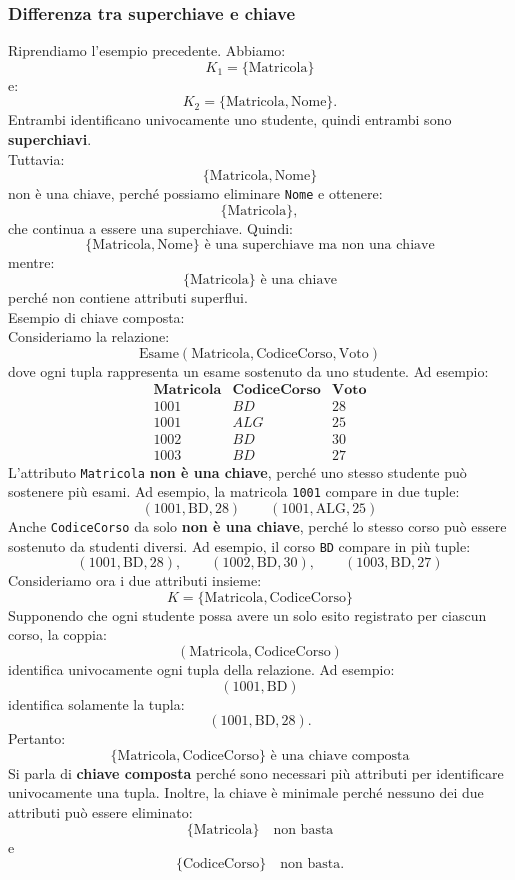 \subsubsection{Differenza tra superchiave e chiave}
Riprendiamo l'esempio precedente.
Abbiamo:
\[
K_1 = \{\text{Matricola}\}
\]
e:
\[
K_2 = \{\text{Matricola},\text{Nome}\}.
\]
Entrambi identificano univocamente uno studente, quindi entrambi sono
\textbf{superchiavi}.\\
Tuttavia:
\[
\{\text{Matricola},\text{Nome}\}
\]
non è una chiave, perché possiamo eliminare \texttt{Nome} e ottenere:
\[
\{\text{Matricola}\},
\]
che continua a essere una superchiave.
Quindi:
\[
\boxed{
\{\text{Matricola},\text{Nome}\}
\text{ è una superchiave ma non una chiave}
}
\]
mentre:
\[
\boxed{
\{\text{Matricola}\}
\text{ è una chiave}
}
\]
perché non contiene attributi superflui.\medskip\\
\textcolor{verdeEsempio}{Esempio} di chiave composta:\\
Consideriamo la relazione:
\[
\text{Esame}(\text{Matricola}, \text{CodiceCorso}, \text{Voto})
\]
dove ogni tupla rappresenta un esame sostenuto da uno studente.
Ad esempio:
\[
\begin{array}{c|c|c}
\textbf{Matricola} & \textbf{CodiceCorso} & \textbf{Voto} \\ \hline
1001 & BD & 28 \\
1001 & ALG & 25 \\
1002 & BD & 30 \\
1003 & BD & 27
\end{array}
\]
L'attributo \texttt{Matricola} \textbf{non è una chiave}, perché uno
stesso studente può sostenere più esami.
Ad esempio, la matricola \texttt{1001} compare in due tuple:
\[
(1001,\text{BD},28)
\qquad
(1001,\text{ALG},25)
\]
Anche \texttt{CodiceCorso} da solo \textbf{non è una chiave}, perché
lo stesso corso può essere sostenuto da studenti diversi.
Ad esempio, il corso \texttt{BD} compare in più tuple:
\[
(1001,\text{BD},28), \qquad
(1002,\text{BD},30), \qquad
(1003,\text{BD},27)
\]
Consideriamo ora i due attributi insieme:
\[
K = \{\text{Matricola},\text{CodiceCorso}\}
\]
Supponendo che ogni studente possa avere un solo esito registrato per
ciascun corso, la coppia:
\[
(\text{Matricola},\text{CodiceCorso})
\]
identifica univocamente ogni tupla della relazione.
Ad esempio:
\[
(1001,\text{BD})
\]
identifica solamente la tupla:
\[
(1001,\text{BD},28).
\]
Pertanto:
\[
\boxed{
\{\text{Matricola},\text{CodiceCorso}\}
\text{ è una chiave composta}
}
\]
Si parla di \textbf{chiave composta} perché sono necessari più attributi
per identificare univocamente una tupla.
Inoltre, la chiave è minimale perché nessuno dei due attributi può essere
eliminato:
\[
\{\text{Matricola}\}
\quad \text{non basta}
\]
e
\[
\{\text{CodiceCorso}\}
\quad \text{non basta}.
\]

